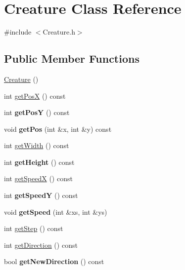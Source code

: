 \hypertarget{class_creature}{}\section{Creature Class Reference}
\label{class_creature}


{\ttfamily \#include $<$Creature.\+h$>$}

\subsection*{Public Member Functions}
\begin{DoxyCompactItemize}
\item 
\hyperlink{class_creature_a597cc3b08ee17de46c3e7ec3cf0d9b58}{Creature} ()
\item 
int \hyperlink{class_creature_a0d7b89570fa2086394e383a19c030d91}{get\+Pos\+X} () const 
\item 
\hypertarget{class_creature_aef4463fa5caac121b213670f40cdc842}{}int {\bfseries get\+Pos\+Y} () const \label{class_creature_aef4463fa5caac121b213670f40cdc842}

\item 
\hypertarget{class_creature_a290c9f2bcb48d2e6d52a0e55b18827ca}{}void {\bfseries get\+Pos} (int \&x, int \&y) const \label{class_creature_a290c9f2bcb48d2e6d52a0e55b18827ca}

\item 
int \hyperlink{class_creature_a91a12d315874520b7644d67826c36aa6}{get\+Width} () const 
\item 
\hypertarget{class_creature_a5f1de5af0a601ec8f61106f777aad821}{}int {\bfseries get\+Height} () const \label{class_creature_a5f1de5af0a601ec8f61106f777aad821}

\item 
int \hyperlink{class_creature_a053890278a1c6b0d0a134ea4c57f1ca5}{get\+Speed\+X} () const 
\item 
\hypertarget{class_creature_a7f2dc664fe89dd7c2a7abb89367d367d}{}int {\bfseries get\+Speed\+Y} () const \label{class_creature_a7f2dc664fe89dd7c2a7abb89367d367d}

\item 
\hypertarget{class_creature_a5f08c0458f96e39efb3f6a2c45252a77}{}void {\bfseries get\+Speed} (int \&xs, int \&ys)\label{class_creature_a5f08c0458f96e39efb3f6a2c45252a77}

\item 
int \hyperlink{class_creature_ad7dd3cd12b019a2acb813af36e7cec8c}{get\+Step} () const 
\item 
int \hyperlink{class_creature_aa7f992633d31f221d6e9f4a459390238}{get\+Direction} () const 
\item 
\hypertarget{class_creature_a5daa6a36933c9883f58262edfdb48d01}{}bool {\bfseries get\+New\+Direction} () const \label{class_creature_a5daa6a36933c9883f58262edfdb48d01}


\end{DoxyCompactItemize}

